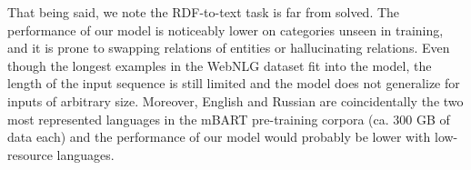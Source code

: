 That being said, we note the RDF-to-text task is far from solved. The performance of our model is noticeably lower on categories unseen in training, and it is prone to swapping relations of entities or hallucinating relations. Even though the longest examples in the WebNLG dataset fit into the model, the length of the input sequence is still limited and the model does not generalize for inputs of arbitrary size.
Moreover, English and Russian are coincidentally the two most represented languages in the mBART pre-training corpora (ca. 300 GB of data each) and the performance of our model would probably be lower with low-resource languages.


